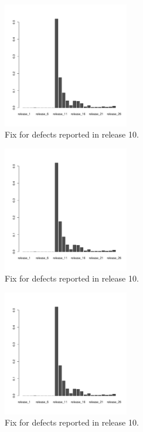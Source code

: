 \begin{figure}[thb!]
      \caption{Fix for defects reported in release 10.}
      \label{fig:defect_release_10}
      \includegraphics[width=0.49\textwidth]{figures/r10}
\end{figure}

\begin{figure}[thb!]
      \caption{Fix for defects reported in release 10.}
      \label{fig:defect_release_10}
      \includegraphics[width=0.49\textwidth]{figures/r10}
\end{figure}

\begin{figure}[thb!]
      \caption{Fix for defects reported in release 10.}
      \label{fig:defect_release_10}
      \includegraphics[width=0.49\textwidth]{figures/r10}
\end{figure}

